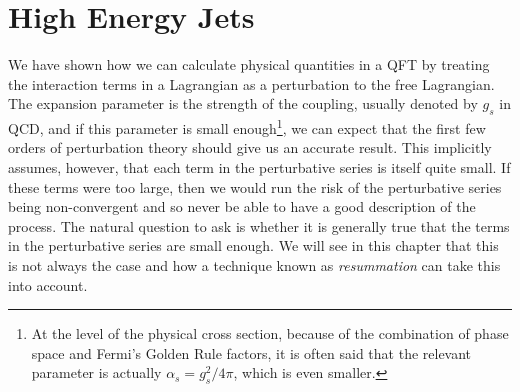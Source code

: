 \chapter{High Energy Jets}


We have shown how we can calculate physical quantities in a QFT by treating the interaction terms in a Lagrangian as a perturbation to the free Lagrangian. The expansion parameter is the strength of the coupling, usually denoted by $g_s$ in QCD, and if this parameter is small enough\footnote{At the level of the physical cross section, because of the combination of phase space and Fermi's Golden Rule factors, it is often said that the relevant parameter is actually $\alpha_s = g_s^2/4 \pi$, which is even smaller.}, we can expect that the first few orders of perturbation theory should give us an accurate result. This implicitly assumes, however, that each term in the perturbative series is itself quite small. If these terms were too large, then we would run the risk of the perturbative series being non-convergent and so never be able to have a good description of the process. The natural question to ask is whether it is generally true that the terms in the perturbative series are small enough. We will see in this chapter that this is not always the case and how a technique known as \emph{resummation} can take this into account. 

